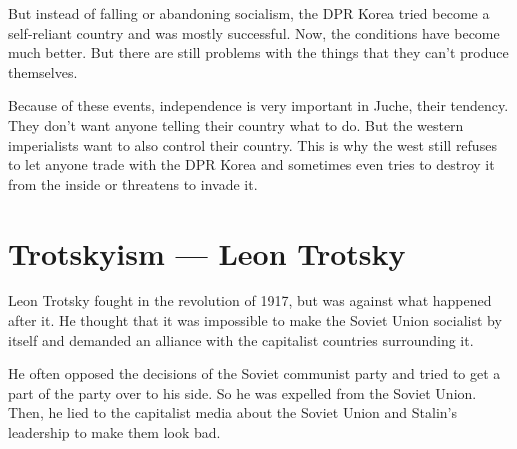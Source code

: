 \documentclass[a4paper]{book}%
\begin{document}
But instead of falling or abandoning socialism, the DPR Korea tried become a self-reliant country and was mostly successful. Now, the conditions have become much better. But there are still problems with the things that they can't produce themselves.

Because of these events, independence is very important in Juche, their tendency. They don't want anyone telling their country what to do. But the western imperialists want to also control their country. This is why the west still refuses to let anyone trade with the DPR Korea and sometimes even tries to destroy it from the inside or threatens to invade it.

\section{Trotskyism --- Leon Trotsky}

Leon Trotsky fought in the revolution of 1917, but was against what happened after it. He thought that it was impossible to make the Soviet Union socialist by itself and demanded an alliance with the capitalist countries surrounding it.

He often opposed the decisions of the Soviet communist party and tried to get a part of the party over to his side. So he was expelled from the Soviet Union. Then, he lied to the capitalist media about the Soviet Union and Stalin's leadership to make them look bad.
\end{document}
